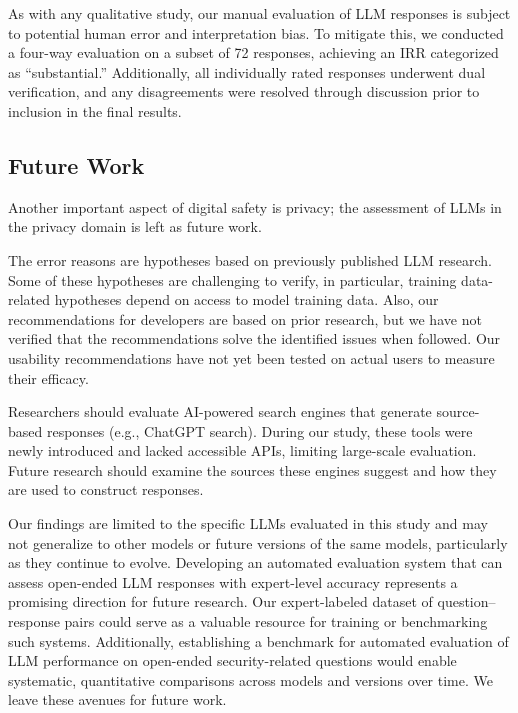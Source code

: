As with any qualitative study, our manual evaluation of LLM responses is subject to potential human error and interpretation bias. To mitigate this, we conducted a four-way evaluation on a subset of 72 responses, achieving an IRR categorized as “substantial.” Additionally, all individually rated responses underwent dual verification, and any disagreements were resolved through discussion prior to inclusion in the final results. 

\subsection{Future Work}
Another important aspect of digital safety is privacy; the assessment of LLMs in the privacy domain is left as future work.%

The error reasons are hypotheses based on previously published LLM research. Some of these hypotheses are challenging to verify, in particular, training data-related hypotheses depend on access to model training data. Also, our recommendations for developers are based on prior research, but we have not verified that the recommendations solve the identified issues when followed. %
Our usability recommendations have not yet been tested on actual users to measure their efficacy. %

Researchers should evaluate AI-powered search engines that generate source-based responses (e.g., ChatGPT search). During our study, these tools were newly introduced and lacked accessible APIs, limiting large-scale evaluation. Future research should examine the sources these engines suggest and how they are used to construct responses.

Our findings are limited to the specific LLMs evaluated in this study and may not generalize to other models or future versions of the same models, particularly as they continue to evolve. Developing an automated evaluation system that can assess open-ended LLM responses with expert-level accuracy represents a promising direction for future research. Our expert-labeled dataset of question–response pairs could serve as a valuable resource for training or benchmarking such systems. Additionally, establishing a benchmark for automated evaluation of LLM performance on open-ended security-related questions would enable systematic, quantitative comparisons across models and versions over time. We leave these avenues for future work.